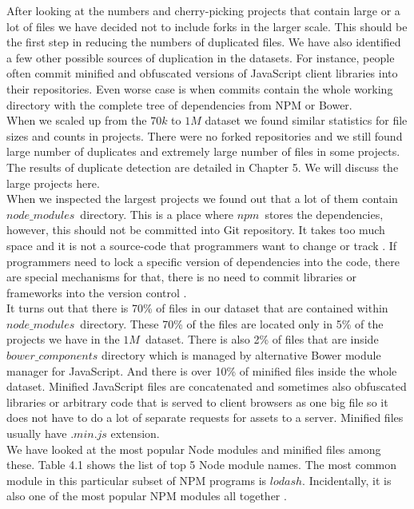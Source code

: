 \documentclass[thesis=M,english]{FITthesis}[2012/10/20]
\begin{document}
After looking at the numbers and cherry-picking projects that contain large or a lot of files we have decided not to include forks in the larger scale. This should be the first step in reducing the numbers of duplicated files. We have also identified a few other possible sources of duplication in the datasets. For instance, people often commit minified and obfuscated versions of JavaScript client libraries into their repositories. Even worse case is when commits contain the whole working directory with the complete tree of dependencies from NPM or Bower. \\

When we scaled up from the $70k$ to $1M$ dataset we found similar statistics for file sizes and counts in projects. There were no forked repositories and we still found large number of duplicates and extremely large number of files in some projects. The results of duplicate detection are detailed in Chapter 5. We will discuss the large projects here. \\

When we inspected the largest projects we found out that a lot of them contain $node\_modules$ directory. This is a place where $npm$ stores the dependencies, however, this should not be committed into Git repository. It takes too much space and it is not a source-code that programmers want to change or track \cite{gitignore}. If programmers need to lock a specific version of dependencies into the code, there are special mechanisms for that, there is no need to commit libraries or frameworks into the version control \cite{shrinkwrap, yarnlock}. \\

It turns out that there is 70\% of files in our dataset that are contained within $node\_modules$ directory. These 70\% of the files are located only in 5\% of the projects we have in the $1M$ dataset. There is also 2\% of files that are inside $bower\_components$ directory which is managed by alternative Bower module manager for JavaScript. And there is over 10\% of minified files inside the whole dataset. Minified JavaScript files are concatenated and sometimes also obfuscated libraries or arbitrary code that is served to client browsers as one big file so it does not have to do a lot of separate requests for assets to a server. Minified files usually have $.min.js$ extension. \\

We have looked at the most popular Node modules and minified files among these. Table 4.1 shows the list of top 5 Node module names. The most common module in this particular subset of NPM programs is $lodash$. Incidentally, it is also one of the most popular NPM modules all together \cite{npm}.
\end{document}
